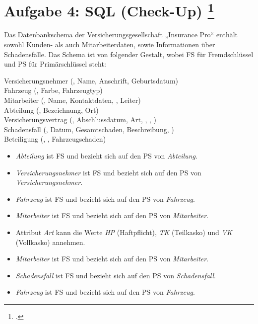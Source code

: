 \documentclass{lehramt-informatik-aufgabe}
\begin{document}
\section{Aufgabe 4: SQL (Check-Up)
\footcite[Thema 1 Teilaufgabe 2 Aufgabe 4]{examen:46116:2015:09}}

Das Datenbankschema der Versicherungsgesellschaft „Insurance Pro“
enthält sowohl Kunden- als auch Mitarbeiterdaten, sowie Informationen
über Schadensfälle. Das Schema ist von folgender Gestalt, wobei FS für
Fremdschlüssel und PS für Primärschlüssel steht:

\bigskip

{
\ttfamily
\noindent
Versicherungsnehmer (, Name, Anschrift, Geburtsdatum)\\

\noindent
Fahrzeug (, Farbe, Fahrzeugtyp)\\

\noindent
Mitarbeiter (, Name, Kontaktdaten, ,
Leiter)\\

\noindent
Abteilung (, Bezeichnung, Ort)\\

\noindent
Versicherungsvertrag (, Abschlussdatum, Art,
, ,
)\\

\noindent
Schadensfall (, Datum, Gesamtschaden, Beschreibung,
)\\

\noindent
Beteiligung (, ,
Fahrzeugschaden)}

\bigskip

\begin{itemize}
\item \emph{Abteilung} ist FS und bezieht sich auf den PS von
\emph{Abteilung}.

\item \emph{Versicherungsnehmer} ist FS und bezieht sich auf den PS von
\emph{Versicherungsnehmer}.

\item \emph{Fahrzeug} ist FS und bezieht sich auf den PS von
\emph{Fahrzeug}.

\item \emph{Mitarbeiter} ist FS und bezieht sich auf den PS von
\emph{Mitarbeiter}.

\item Attribut \emph{Art} kann die Werte \emph{HP} (Haftpflicht),
\emph{TK} (Teilkasko) und \emph{VK} (Vollkasko) annehmen.

\item \emph{Mitarbeiter} ist FS und bezieht sich auf den PS von
\emph{Mitarbeiter}.

\item \emph{Schadensfall} ist FS und bezieht sich auf den PS von
\emph{Schadensfall}.

\item \emph{Fahrzeug} ist FS und bezieht sich auf den PS von
\emph{Fahrzeug}.
\end{itemize}
\end{document}
